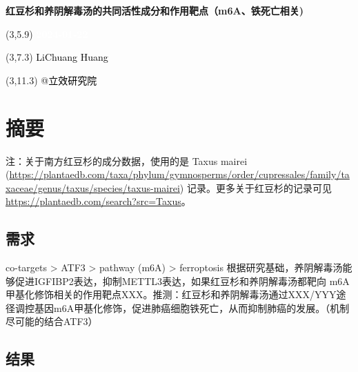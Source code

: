\documentclass[
]{article}
\author{}
\date{\vspace{-2.5em}}
\begin{document}
\begin{titlepage} 
\begin{center} \textbf{\Huge
红豆杉和养阴解毒汤的共同活性成分和作用靶点（m6A、铁死亡相关)}
\vspace{4em} \begin{textblock}{10}(3,5.9) \huge
\textbf{\textcolor{white}{2024-01-22}}
\end{textblock} \begin{textblock}{10}(3,7.3)
\Large \textcolor{black}{LiChuang Huang}
\end{textblock} \begin{textblock}{10}(3,11.3)
\Large \textcolor{black}{@立效研究院}
\end{textblock} \end{center} \end{titlepage}
\restoregeometry


\tableofcontents

\listoffigures

\listoftables

\newpage


\hypertarget{abstract}{%
\section{摘要}\label{abstract}}

注：关于南方红豆杉的成分数据，使用的是 Taxus mairei (\url{https://plantaedb.com/taxa/phylum/gymnosperms/order/cupressales/family/taxaceae/genus/taxus/species/taxus-mairei}) 记录。更多关于红豆杉的记录可见 \url{https://plantaedb.com/search?src=Taxus}。

\hypertarget{ux9700ux6c42}{%
\subsection{需求}\label{ux9700ux6c42}}

co-targets \textgreater{} ATF3 \textgreater{} pathway (m6A) \textgreater{} ferroptosis
根据研究基础，养阴解毒汤能够促进IGFIBP2表达，抑制METTL3表达，如果红豆杉和养阴解毒汤都靶向 m6A 甲基化修饰相关的作用靶点XXX。推测：红豆杉和养阴解毒汤通过XXX/YYY途径调控基因m6A甲基化修饰，促进肺癌细胞铁死亡，从而抑制肺癌的发展。（机制尽可能的结合ATF3）

\hypertarget{ux7ed3ux679c}{%
\subsection{结果}\label{ux7ed3ux679c}}
\end{document}
